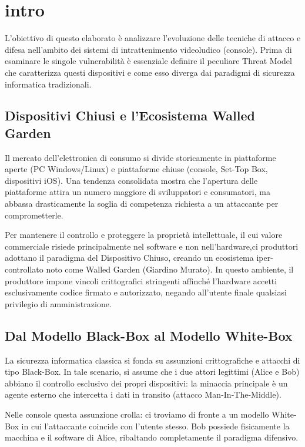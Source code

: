 \section{intro}

L'obiettivo di questo elaborato è analizzare l'evoluzione delle tecniche di attacco e difesa nell'ambito dei sistemi di intrattenimento videoludico (console). Prima di esaminare le singole vulnerabilità è essenziale definire il peculiare Threat Model che caratterizza questi dispositivi e come esso diverga dai paradigmi di sicurezza informatica tradizionali.

\subsection{Dispositivi Chiusi e l'Ecosistema \guillemotleft{}Walled Garden\guillemotright{}}

Il mercato dell'elettronica di consumo si divide storicamente in piattaforme aperte (PC Windows/Linux) e piattaforme chiuse (console, Set-Top Box, dispositivi iOS). Una tendenza consolidata mostra che l'apertura delle piattaforme attira un numero maggiore di sviluppatori e consumatori, ma abbassa drasticamente la soglia di competenza richiesta a un attaccante per comprometterle.

Per mantenere il controllo e proteggere la proprietà intellettuale, il cui valore commerciale risiede principalmente nel software e non nell'hardware,ci produttori adottano il paradigma del Dispositivo Chiuso, creando un ecosistema iper-controllato noto come Walled Garden (Giardino Murato). In questo ambiente, il produttore impone vincoli crittografici stringenti affinché l'hardware accetti esclusivamente codice firmato e autorizzato, negando all'utente finale qualsiasi privilegio di amministrazione.

\subsection{Dal Modello Black-Box al Modello White-Box}

La sicurezza informatica classica si fonda su assunzioni crittografiche e attacchi di tipo Black-Box. In tale scenario, si assume che i due attori legittimi (Alice e Bob) abbiano il controllo esclusivo dei propri dispositivi: la minaccia principale è un agente esterno che intercetta i dati in transito (attacco Man-In-The-Middle).

Nelle console questa assunzione crolla: ci troviamo di fronte a un modello White-Box in cui l'attaccante coincide con l'utente stesso. Bob possiede fisicamente la macchina e il software di Alice, ribaltando completamente il paradigma difensivo.

